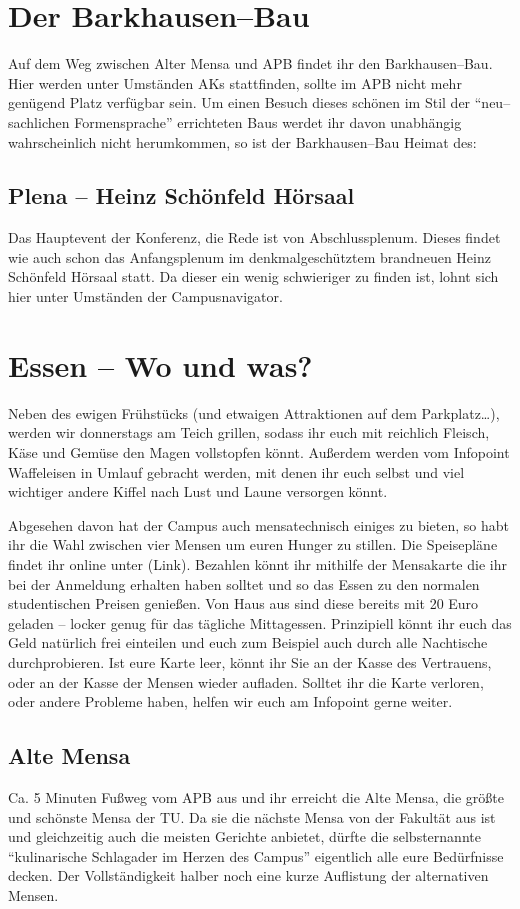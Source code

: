 \section*{Der Barkhausen--Bau}
Auf dem Weg zwischen Alter Mensa und APB findet ihr den Barkhausen--Bau.
Hier werden unter Umständen AKs stattfinden, sollte im APB nicht mehr genügend Platz verfügbar sein.
Um einen Besuch dieses schönen im Stil der \enquote{neu--sachlichen Formensprache} errichteten Baus werdet ihr davon unabhängig wahrscheinlich nicht herumkommen, so ist der Barkhausen--Bau Heimat des:

\subsection*{Plena -- Heinz Schönfeld Hörsaal}
Das Hauptevent der Konferenz, die Rede ist von Abschlussplenum.
Dieses findet wie auch schon das Anfangsplenum im denkmalgeschütztem brandneuen Heinz Schönfeld Hörsaal statt.
Da dieser ein wenig schwieriger zu finden ist, lohnt sich hier unter Umständen der Campusnavigator.

\section*{Essen -- Wo und was?}
Neben des ewigen Frühstücks (und etwaigen Attraktionen auf dem Parkplatz…), werden wir donnerstags am Teich grillen, sodass ihr euch mit reichlich Fleisch, Käse und Gemüse den Magen vollstopfen könnt.
Außerdem werden vom Infopoint Waffeleisen in Umlauf gebracht werden, mit denen ihr euch selbst und viel wichtiger andere Kiffel nach Lust und Laune versorgen könnt.

Abgesehen davon hat der Campus auch mensatechnisch einiges zu bieten, so habt ihr die Wahl zwischen vier Mensen um euren Hunger zu stillen.
Die Speisepläne findet ihr online unter (Link).
Bezahlen könnt ihr mithilfe der Mensakarte die ihr bei der Anmeldung erhalten haben solltet und so das Essen zu den normalen studentischen Preisen genießen.
Von Haus aus sind diese bereits mit 20 Euro geladen -- locker genug für das tägliche Mittagessen.
Prinzipiell könnt ihr euch das Geld natürlich frei einteilen und euch zum Beispiel auch durch alle Nachtische durchprobieren.
Ist eure Karte leer, könnt ihr Sie an der Kasse des Vertrauens, oder an der Kasse der Mensen wieder aufladen.
Solltet ihr die Karte verloren, oder andere Probleme haben, helfen wir euch am Infopoint gerne weiter.

\subsection*{Alte Mensa}
Ca. 5 Minuten Fußweg vom APB aus und ihr erreicht die Alte Mensa, die größte und schönste Mensa der TU\@.
Da sie die nächste Mensa von der Fakultät aus ist und gleichzeitig auch die meisten Gerichte anbietet, dürfte die selbsternannte \enquote{kulinarische Schlagader im Herzen des Campus} eigentlich alle eure Bedürfnisse decken.
Der Vollständigkeit halber noch eine kurze Auflistung der alternativen Mensen.

